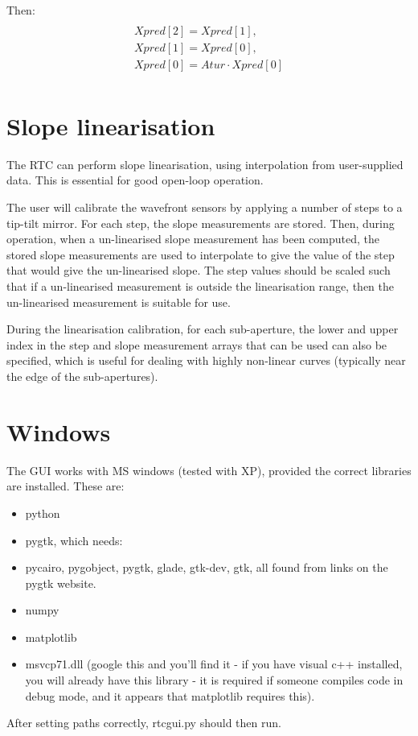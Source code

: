 \documentclass[a4,10pt]{article}
\begin{document}
Then: 
\begin{multline}\\
Xpred[2]=Xpred[1],\\
Xpred[1]=Xpred[0],\\
Xpred[0]=Atur \cdot Xpred[0]\\
\end{multline}

\section{Slope linearisation}
\label{sect:linearisation}
The RTC can perform slope linearisation, using interpolation from
user-supplied data.  This is essential for good open-loop operation.

The user will calibrate the wavefront sensors by applying a number of
steps to a tip-tilt mirror.  For each step, the slope measurements are
stored.  Then, during operation, when a un-linearised slope
measurement has been computed, the stored slope measurements are used
to interpolate to give the value of the step that would give the
un-linearised slope.  The step values should be scaled such that if a
un-linearised measurement is outside the linearisation range, then the
un-linearised measurement is suitable for use.

During the linearisation calibration, for each sub-aperture, the lower
and upper index in the step and slope measurement arrays that can be
used can also be specified, which is useful for dealing with highly
non-linear curves (typically near the edge of the sub-apertures).  



\section{Windows}
The GUI works with MS windows (tested with XP), provided the
correct libraries are installed.  These are:
\begin{itemize}
\item python
\item pygtk, which needs:
\item pycairo, pygobject, pygtk, glade, gtk-dev, gtk, all found from links
on the pygtk website.
\item numpy
\item matplotlib
\item msvcp71.dll (google this and you'll find it - if you have visual c++
installed, you will already have this library - it is required if
someone compiles code in debug mode, and it appears that matplotlib
requires this).
\end{itemize}
After setting paths correctly, rtcgui.py should then run.
\end{document}
